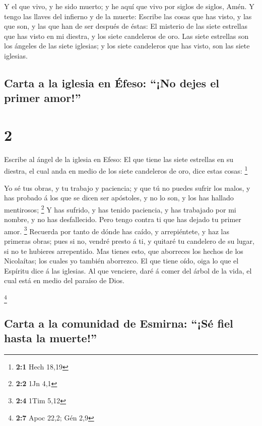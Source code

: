  Y el que vivo, y he sido muerto; y he aquí que vivo por
siglos de siglos, Amén. Y tengo las llaves del infierno y de la muerte:
 Escribe las cosas que has visto, y las que son, y las
que han de ser después de éstas:  El misterio de las
siete estrellas que has visto en mi diestra, y los siete candeleros de
oro. Las siete estrellas son los ángeles de las siete iglesias; y los
siete candeleros que has visto, son las siete iglesias.

\hypertarget{carta-a-la-iglesia-en-uxe9feso-no-dejes-el-primer-amor}{%
\subsection{Carta a la iglesia en Éfeso: ``¡No dejes el primer
amor!''}\label{carta-a-la-iglesia-en-uxe9feso-no-dejes-el-primer-amor}}

\hypertarget{section-1}{%
\section{2}\label{section-1}}

 Escribe al ángel de la iglesia en Efeso: El que tiene las
siete estrellas en su diestra, el cual anda en medio de los siete
candeleros de oro, dice estas cosas: \footnote{\textbf{2:1} Hech 18,19}

 Yo sé tus obras, y tu trabajo y paciencia; y que tú no
puedes sufrir los malos, y has probado á los que se dicen ser apóstoles,
y no lo son, y los has hallado mentirosos; \footnote{\textbf{2:2} 1Jn
  4,1}  Y has sufrido, y has tenido paciencia, y has
trabajado por mi nombre, y no has desfallecido.  Pero
tengo contra ti que has dejado tu primer amor. \footnote{\textbf{2:4}
  1Tim 5,12}  Recuerda por tanto de dónde has caído, y
arrepiéntete, y haz las primeras obras; pues si no, vendré presto á ti,
y quitaré tu candelero de su lugar, si no te hubieres arrepentido.
 Mas tienes esto, que aborreces los hechos de los
Nicolaítas; los cuales yo también aborrezco.  El que tiene
oído, oiga lo que el Espíritu dice á las iglesias. Al que venciere, daré
á comer del árbol de la vida, el cual está en medio del paraíso de Dios.

\footnote{\textbf{2:7} Apoc 22,2; Gén 2,9}

\hypertarget{carta-a-la-comunidad-de-esmirna-suxe9-fiel-hasta-la-muerte}{%
\subsection{Carta a la comunidad de Esmirna: ``¡Sé fiel hasta la
muerte!''}\label{carta-a-la-comunidad-de-esmirna-suxe9-fiel-hasta-la-muerte}}

